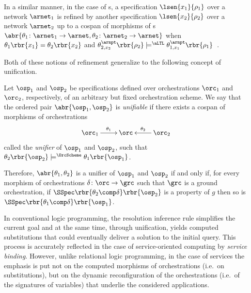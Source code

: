 \documentclass{LMCS}
\begin{document}
  In a similar manner, in the case of s, a specification \(\lsen{x_{1}}{\rho_{1}}\) over a network \(\arnet_{1}\) is refined by another specification \(\lsen{x_{2}}{\rho_{2}}\) over a network \(\arnet_{2}\) up to a cospan of morphisms of s \(\abr{\theta_{1} \colon \arnet_{1} \to \arnet, \theta_{2} \colon \arnet_{2} \to \arnet}\) when \(\theta_{1}\rbr{x_{1}} = \theta_{2}\rbr{x_{2}}\) and \(\theta^{\arnpt}_{2, x_{2}}\rbr{\rho_{2}} \models^{\aLTL} \theta^{\arnpt}_{1, x_{1}}\rbr{\rho_{1}}\)~\cite{Tutu-Fiadeiro:A-logic-programming-semantics-of-services-2013}.

  Both of these notions of refinement generalize to the following concept of unification.

  \begin{defi}[Unification]
    \label{definition:service-oriented-unification}
    Let \(\osp_{1}\) and \(\osp_{2}\) be specifications defined over orchestrations \(\orc_{1}\) and \(\orc_{2}\), respectively, of an arbitrary but fixed orchestration scheme.
    We say that the ordered pair \(\abr{\osp_{1}, \osp_{2}}\) is \emph{unifiable} if there exists a cospan of morphisms of orchestrations
    \[
    \xymatrix {
      {\orc_{1}}
      \ar [r] ^-{\theta_{1}}
      & {\orc}
      & {\orc_{2}}
      \ar [l] _-{\theta_{2}}
    }
    \]
    called the \emph{unifier} of \(\osp_{1}\) and \(\osp_{2}\), such that \(\theta_{2}\rbr{\osp_{2}} \models^{\OrcScheme} \theta_{1}\rbr{\osp_{1}}\).
  \end{defi}

  \noindent Therefore, \(\abr{\theta_{1}, \theta_{2}}\) is a unifier of \(\osp_{1}\) and \(\osp_{2}\) if and only if, for every morphism of orchestrations \(\delta \colon \orc \to \grc\) such that \(\grc\) is a ground orchestration, if \(\SSpec\rbr{\theta_{2} \comp \delta}\rbr{\osp_{2}}\) is a property of \(g\) then so is \(\SSpec\rbr{\theta_{1} \comp \delta}\rbr{\osp_{1}}\).

  In conventional logic programming, the resolution inference rule simplifies the current goal and at the same time, through unification, yields computed substitutions that could eventually deliver a solution to the initial query.  This process is accurately reflected in the case of service-oriented computing by \emph{service binding}.
  However, unlike relational logic programming, in the case of services the emphasis is put not on the computed morphisms of orchestrations (i.e.\ on substitutions), but on the dynamic reconfiguration of the orchestrations (i.e.\ of the signatures of variables) that underlie the considered applications.
\end{document}
